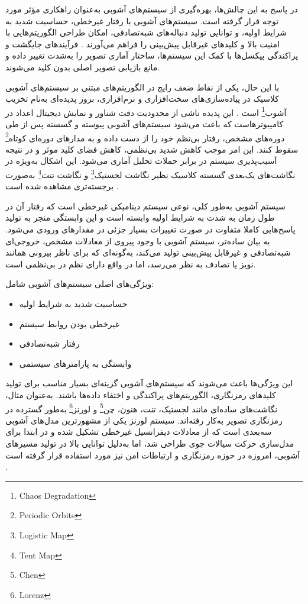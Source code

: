 در پاسخ به این چالش‌ها، بهره‌گیری از سیستم‌های آشوبی به‌عنوان راهکاری مؤثر مورد توجه قرار گرفته است. سیستم‌های آشوبی با رفتار غیرخطی، حساسیت شدید به شرایط اولیه، و توانایی تولید دنباله‌های شبه‌تصادفی، امکان طراحی الگوریتم‌هایی با امنیت بالا و کلیدهای غیرقابل پیش‌بینی را فراهم می‌آورند \cite{ref4}. فرآیندهای جایگشت و پراکندگی پیکسل‌ها با کمک این سیستم‌ها، ساختار آماری تصویر را به‌شدت تغییر داده و مانع بازیابی تصویر اصلی بدون کلید می‌شوند.

با این حال، یکی از نقاط ضعف رایج در الگوریتم‌های مبتنی بر سیستم‌های آشوبی کلاسیک در پیاده‌سازی‌های سخت‌افزاری و نرم‌افزاری، بروز پدیده‌ای به‌نام تخریب آشوب\footnote{Chaos Degradation} است \cite{ref5, ref19}. این پدیده ناشی از محدودیت دقت شناور و نمایش دیجیتال اعداد در کامپیوترهاست که باعث می‌شود سیستم‌های آشوبی پیوسته و گسسته پس از طی دوره‌های مشخص، رفتار بی‌نظم خود را از دست داده و به مدارهای دوره‌ای کوتاه\footnote{Periodic Orbits} سقوط کنند. این امر موجب کاهش شدید بی‌نظمی، کاهش فضای کلید موثر و در نتیجه آسیب‌پذیری سیستم در برابر حملات تحلیل آماری می‌شود. این اشکال به‌ویژه در نگاشت‌های یک‌بعدی گسسته کلاسیک نظیر نگاشت لجستیک\footnote{Logistic Map} و نگاشت تنت\footnote{Tent Map} به‌صورت برجسته‌تری مشاهده شده است \cite{ref5}.

سیستم آشوبی به‌طور کلی، نوعی سیستم دینامیکی غیرخطی است که رفتار آن در طول زمان به شدت به شرایط اولیه وابسته است و این وابستگی منجر به تولید پاسخ‌هایی کاملا متفاوت در صورت تغییرات بسیار جزئی در مقدارهای ورودی می‌شود. به بیان ساده‌تر، سیستم آشوبی با وجود پیروی از معادلات مشخص، خروجی‌ای شبه‌تصادفی و غیرقابل پیش‌بینی تولید می‌کند، به‌گونه‌ای که برای ناظر بیرونی همانند نویز یا تصادف به نظر می‌رسد، اما در واقع دارای نظم در بی‌نظمی است.

ویژگی‌های اصلی سیستم‌های آشوبی شامل:

\begin{itemize}
    \item حساسیت شدید به شرایط اولیه
    \item غیرخطی بودن روابط سیستم
    \item رفتار شبه‌تصادفی
    \item وابستگی به پارامترهای سیستمی
\end{itemize}

این ویژگی‌ها باعث می‌شوند که سیستم‌های آشوبی گزینه‌ای بسیار مناسب برای تولید کلیدهای رمزنگاری، الگوریتم‌های پراکندگی و اختفاء داده‌ها باشند. به‌عنوان مثال، نگاشت‌های ساده‌ای مانند لجستیک، تنت، هنون، چن\footnote{Chen} و لورنز\footnote{Lorenz} به‌طور گسترده در رمزنگاری تصویر به‌کار رفته‌اند. سیستم لورنز یکی از مشهورترین مدل‌های آشوبی سه‌بعدی است که از معادلات دیفرانسیل غیرخطی تشکیل شده و در ابتدا برای مدل‌سازی حرکت سیالات جوی طراحی شد، اما به‌دلیل توانایی بالا در تولید مسیرهای آشوبی، امروزه در حوزه رمزنگاری و ارتباطات امن نیز مورد استفاده قرار گرفته است \cite{ref6}.

